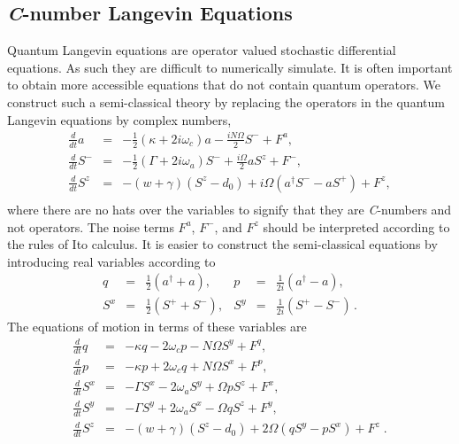 \documentclass[aps,
twocolumn,
showpacs,
superscriptaddress,groupedaddress]{revtex4}
\begin{document}
\subsection{{\it C}-number Langevin Equations}

Quantum Langevin equations are operator valued stochastic differential
equations.  As such they are difficult to numerically simulate. It is
often important to obtain more accessible equations that do not
contain quantum operators. We construct such a semi-classical theory
by replacing the operators in the quantum Langevin equations by
complex numbers,
\begin{eqnarray}
\frac{d}{dt} a&=& -\frac{1}{2}  (\kappa +2i\omega_c) a
-\frac{i N \Omega}{2} S^{-}
+F^{a},
\label{Lac}\\
\frac{d}{dt} S^{-} &=& -\frac{1}{2}  \left(\Gamma +2 i \omega_a \right)  S^{-}
+\frac{i \Omega}{2} a S^{z}
+F^{-},\\
\frac{d}{dt} S^{z} &=& -(w+\gamma)\left( S^{z} - d_0\right)
+i\Omega \left( a^{\dagger}S^{-} - a S^{+} \right)
+F^{z},\nonumber\\
\label{Lszc}
\end{eqnarray}
where there are no hats over the variables to signify that they are
{\it C}-numbers and not operators.  The noise terms $F^a$, $F^-$, and
$F^z$ should be interpreted according to the rules of Ito calculus. It is easier to construct the semi-classical equations by introducing
real variables according to
\begin{equation}
\begin{array}{rclrcl}
q &=&
\frac{1}{2} \left( a^{\dagger} + a \right),&
p &=&
\frac{1}{2i} \left( a^{\dagger} - a \right),
\\[1pc]
S^x &=&
\frac{1}{2} \left( S^{+} + S^{-} \right),&
S^y &=&
\frac{1}{2i} \left( S^{+} - S^{-} \right)\,.
\end{array}
\end{equation}
The equations of motion in terms of these variables are
\begin{eqnarray}
\frac{d}{dt} q &=& -\kappa q - 2 \omega_c p - N \Omega S^{y} + F^{q},
\label{cq1}
\\
\frac{d}{dt} p&=& -\kappa p + 2 \omega_c q + N \Omega S^{x} + F^{p},
\\
\frac{d}{dt} S^{x} &=&
-\Gamma S^{x}  - 2 \omega_a S^{y} + \Omega p S^{z} + F^{x},
\\
\frac{d}{dt} S^{y} &=&
-\Gamma S^{y}  + 2 \omega_a S^{x} - \Omega q S^{z} + F^{y},
\\
\frac{d}{dt} S^{z} &=& -(w+\gamma)\left( S^{z} - d_0\right)
+2 \Omega \left( q S^{y} - p S^{x} \right)
+F^{z}\;.
\nonumber
\\
\label{eqn:cnumberlangevin}
\end{eqnarray}
\end{document}
